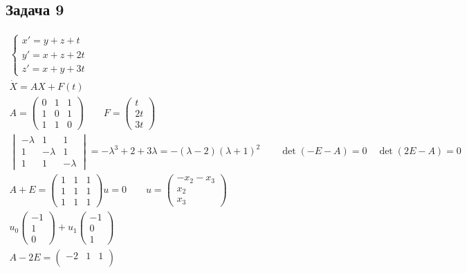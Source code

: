 \subsection*{Задача 9}
	\begin{gather*}
	\begin{cases}
	x' = y + z + t\\
	y' = x + z + 2t\\
	z'= x + y + 3t
	\end{cases}\\
	\dot{X} = AX + F(t)\\
	A = 
	\begin{pmatrix}
		0 & 1 & 1\\
		1 & 0 & 1\\
		1 & 1 & 0
	\end{pmatrix}
	\qquad
	F = 
	\begin{pmatrix}
		t \\ 2t \\ 3t
	\end{pmatrix}\\
	\begin{vmatrix}
		-\lambda & 1 & 1\\
		1 & -\lambda & 1\\
		1 & 1 & -\lambda
	\end{vmatrix}
	=
	-\lambda^3 + 2 + 3 \lambda = -(\lambda - 2)(\lambda + 1)^2\qquad \det(-E - A) = 0\quad \det(2E - A) = 0\\
	A + E = 
	\begin{pmatrix}
		1 & 1 & 1\\
		1 & 1 & 1\\
		1 & 1 & 1
	\end{pmatrix}
	u = 0\qquad
	u = 
	\begin{pmatrix}
		-x_2-x_3 \\ x_2 \\ x_3
	\end{pmatrix}\\
	u_0 
	\begin{pmatrix}
		-1 \\ 1 \\ 0
	\end{pmatrix}
	+ u_1
	\begin{pmatrix}
		-1 \\ 0 \\ 1
	\end{pmatrix}\\
	A - 2E = 
	\begin{pmatrix}
		-2 & 1 & 1\\

\end{pmatrix}
\end{gather*}
